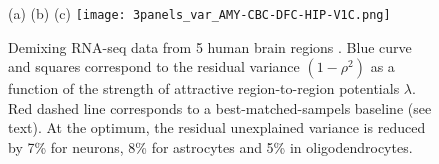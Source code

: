 


\begin{figure}[!hbt]
    \label{fig:human}
   (a) \hspace{120pt}(b) \hspace{120pt}(c) \hspace{120pt}
   \centering
     \texttt{[image: 3panels\_var\_AMY-CBC-DFC-HIP-V1C.png]}
     \caption{Demixing RNA-seq data from 5 human brain regions \cite{brainspan}. Blue curve and squares correspond to the residual variance $(1-\rho^2)$ as a function of the strength of attractive region-to-region potentials $\lambda$. Red dashed line corresponds to a best-matched-sampels baseline (see text). At the optimum, the residual unexplained variance is reduced by 7\% for neurons, 8\% for astrocytes and 5\% in oligodendrocytes.}
    
\end{figure}


